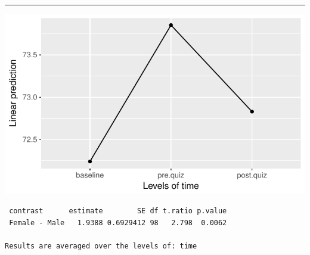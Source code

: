 \documentclass[]{article}
\newenvironment{Shaded}{\begin{snugshade}}{\end{snugshade}}
\newcommand{\KeywordTok}[1]{\textcolor[rgb]{0.13,0.29,0.53}{\textbf{#1}}}
\newcommand{\DataTypeTok}[1]{\textcolor[rgb]{0.13,0.29,0.53}{#1}}
\newcommand{\StringTok}[1]{\textcolor[rgb]{0.31,0.60,0.02}{#1}}
\newcommand{\CommentTok}[1]{\textcolor[rgb]{0.56,0.35,0.01}{\textit{#1}}}
\newcommand{\OperatorTok}[1]{\textcolor[rgb]{0.81,0.36,0.00}{\textbf{#1}}}
\newcommand{\NormalTok}[1]{#1}
\begin{document}
\begin{center}\rule{0.5\linewidth}{\linethickness}\end{center}

\begin{Shaded}
\end{Shaded}

\begin{center}\includegraphics{Unit_5_assignment_KEY_R__spr18__files/figure-latex/unnamed-chunk-86-1} \end{center}

\clearpage

\begin{Shaded}
\end{Shaded}

\begin{verbatim}
 contrast      estimate        SE df t.ratio p.value
 Female - Male   1.9388 0.6929412 98   2.798  0.0062

Results are averaged over the levels of: time 
\end{verbatim}
\end{document}

